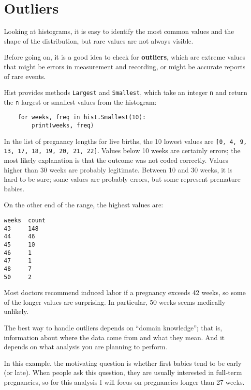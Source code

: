 \section{Outliers}

Looking at histograms, it is easy to identify the most common
values and the shape of the distribution, but rare values are
not always visible.

Before going on, it is a good idea to check for {\bf
  outliers}, which are extreme values that might be errors in
measurement and recording, or might be accurate reports of rare
events.

Hist provides methods {\tt Largest} and {\tt Smallest}, which take
an integer {\tt n} and return the {\tt n} largest or smallest
values from the histogram:

\begin{verbatim}
    for weeks, freq in hist.Smallest(10):
        print(weeks, freq)
\end{verbatim}

In the list of pregnancy lengths for live births, the 10 lowest values
are {\tt [0, 4, 9, 13, 17, 18, 19, 20, 21, 22]}.  Values below 10 weeks
are certainly errors; the most likely explanation is that the outcome
was not coded correctly.  Values higher than 30 weeks are probably
legitimate.  Between 10 and 30 weeks, it is hard to be sure; some
values are probably errors, but some represent premature babies.

On the other end of the range, the highest values are:
%
\begin{verbatim}
weeks  count
43     148
44     46
45     10
46     1
47     1
48     7
50     2
\end{verbatim}

Most doctors recommend induced labor if a pregnancy exceeds 42 weeks,
so some of the longer values are surprising.  In particular, 50 weeks
seems medically unlikely.

The best way to handle outliers depends on ``domain knowledge'';
that is, information about where the data come from and what they
mean.  And it depends on what analysis you are planning to perform.

In this example, the motivating question is whether first babies
tend to be early (or late).  When people ask this question, they are
usually interested in full-term pregnancies, so for this analysis
I will focus on pregnancies longer than 27 weeks.



